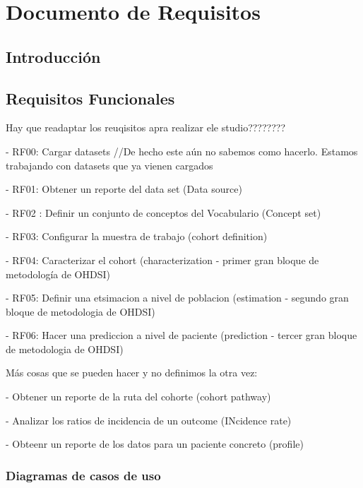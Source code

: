 \chapter{Documento de Requisitos}\label{cap:06requisitos}

\section{Introducción}




\section{Requisitos Funcionales}

Hay que readaptar los reuqisitos apra realizar ele studio????????

- RF00: Cargar datasets //De hecho este aún no sabemos como hacerlo. Estamos trabajando con datasets que ya vienen cargados

- RF01: Obtener un reporte del data set (Data source)

- RF02 : Definir un conjunto de conceptos del Vocabulario (Concept set)

- RF03: Configurar la muestra de trabajo (cohort definition)

- RF04: Caracterizar el cohort (characterization - primer gran bloque de metodología de OHDSI)

- RF05: Definir una etsimacion a nivel de poblacion (estimation - segundo gran bloque de metodologia de OHDSI)

- RF06: Hacer una prediccion a nivel de paciente (prediction - tercer gran bloque de metodologia de OHDSI)



Más cosas que se pueden hacer y no definimos la otra vez:

- Obtener un reporte de la ruta del cohorte (cohort pathway)

- Analizar los ratios de incidencia de un outcome (INcidence rate)

- Obteenr un reporte de los datos para un paciente concreto (profile)

\subsection{Diagramas de casos de uso}


